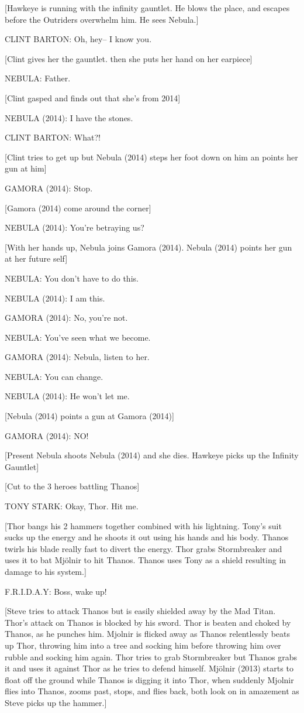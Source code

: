 [Hawkeye is running with the infinity gauntlet. He blows the place, and escapes before the Outriders overwhelm him. He sees Nebula.]

CLINT BARTON: Oh, hey– I know you.

[Clint gives her the gauntlet. then she puts her hand on her earpiece]

NEBULA: Father.

[Clint gasped and finds out that she's from 2014]

NEBULA (2014): I have the stones.

CLINT BARTON: What?!

[Clint tries to get up but Nebula (2014) steps her foot down on him an points her gun at him]

GAMORA (2014): Stop.

[Gamora (2014) come around the corner]

NEBULA (2014): You're betraying us?

[With her hands up, Nebula joins Gamora (2014). Nebula (2014) points her gun at her future self]

NEBULA: You don't have to do this.

NEBULA (2014): I am this.

GAMORA (2014): No, you're not.

NEBULA: You've seen what we become.

GAMORA (2014): Nebula, listen to her.

NEBULA: You can change.

NEBULA (2014): He won't let me.

[Nebula (2014) points a gun at Gamora (2014)]

GAMORA (2014): NO!

[Present Nebula shoots Nebula (2014) and she dies. Hawkeye picks up the Infinity Gauntlet]

[Cut to the 3 heroes battling Thanos]

TONY STARK: Okay, Thor. Hit me.

[Thor bangs his 2 hammers together combined with his lightning. Tony's suit sucks up the energy and he shoots it out using his hands and his body. Thanos twirls his blade really fast to divert the energy. Thor grabs Stormbreaker and uses it to bat Mjölnir to hit Thanos. Thanos uses Tony as a shield resulting in damage to his system.]

F.R.I.D.A.Y: Boss, wake up!

[Steve tries to attack Thanos but is easily shielded away by the Mad Titan. Thor's attack on Thanos is blocked by his sword. Thor is beaten and choked by Thanos, as he punches him. Mjolnir is flicked away as Thanos relentlessly beats up Thor, throwing him into a tree and socking him before throwing him over rubble and socking him again. Thor tries to grab Stormbreaker but Thanos grabs it and uses it against Thor as he tries to defend himself. Mjölnir (2013) starts to float off the ground while Thanos is digging it into Thor, when suddenly Mjolnir flies into Thanos, zooms past, stops, and flies back, both look on in amazement as Steve picks up the hammer.]

